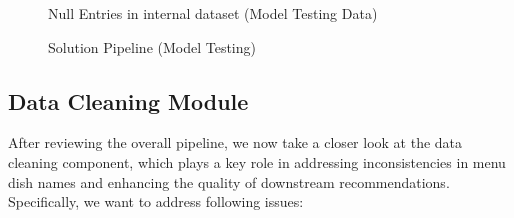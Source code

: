 \documentclass[
  11pt,
  a4paper,
  DIV=11,
  numbers=noendperiod]{scrartcl}
\begin{document}
\begin{figure}

\caption{\label{fig-null-internal}Null Entries in internal dataset
(Model Testing Data)}


\end{figure}%

\begin{figure}

\caption{\label{fig-testing-pipline}Solution Pipeline (Model Testing)}


\end{figure}%

\subsection{Data Cleaning Module}\label{data-cleaning-module}

After reviewing the overall pipeline, we now take a closer look at the
data cleaning component, which plays a key role in addressing
inconsistencies in menu dish names and enhancing the quality of
downstream recommendations. Specifically, we want to address following
issues:
\end{document}
